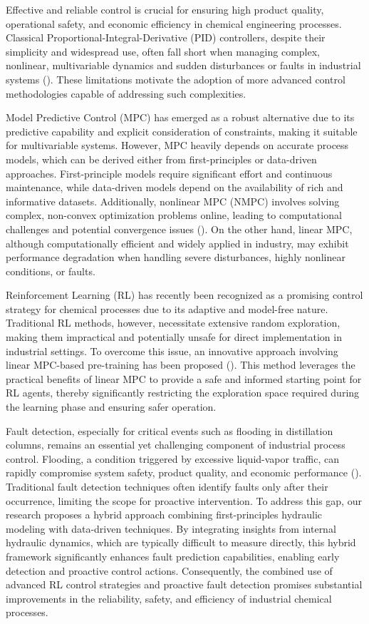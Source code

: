 Effective and reliable control is crucial for ensuring high product quality, operational safety, and economic efficiency in chemical engineering processes. Classical Proportional-Integral-Derivative (PID) controllers, despite their simplicity and widespread use, often fall short when managing complex, nonlinear, multivariable dynamics and sudden disturbances or faults in industrial systems (\cite{wahid2018comparative}). These limitations motivate the adoption of more advanced control methodologies capable of addressing such complexities.


Model Predictive Control (MPC) has emerged as a robust alternative due to its predictive capability and explicit consideration of constraints, making it suitable for multivariable systems. However, MPC heavily depends on accurate process models, which can be derived either from first-principles or data-driven approaches. First-principle models require significant effort and continuous maintenance, while data-driven models depend on the availability of rich and informative datasets. Additionally, nonlinear MPC (NMPC) involves solving complex, non-convex optimization problems online, leading to computational challenges and potential convergence issues (\cite{khather2023review}). On the other hand, linear MPC, although computationally efficient and widely applied in industry, may exhibit performance degradation when handling severe disturbances, highly nonlinear conditions, or faults.

Reinforcement Learning (RL) has recently been recognized as a promising control strategy for chemical processes due to its adaptive and model-free nature. Traditional RL methods, however, necessitate extensive random exploration, making them impractical and potentially unsafe for direct implementation in industrial settings. To overcome this issue, an innovative approach involving linear MPC-based pre-training has been proposed (\cite{hassanpour2024practically}). This method leverages the practical benefits of linear MPC to provide a safe and informed starting point for RL agents, thereby significantly restricting the exploration space required during the learning phase and ensuring safer operation.

Fault detection, especially for critical events such as flooding in distillation columns, remains an essential yet challenging component of industrial process control. Flooding, a condition triggered by excessive liquid-vapor traffic, can rapidly compromise system safety, product quality, and economic performance (\cite{jalanko2021flooding}). Traditional fault detection techniques often identify faults only after their occurrence, limiting the scope for proactive intervention. To address this gap, our research proposes a hybrid approach combining first-principles hydraulic modeling with data-driven techniques. By integrating insights from internal hydraulic dynamics, which are typically difficult to measure directly, this hybrid framework significantly enhances fault prediction capabilities, enabling early detection and proactive control actions. Consequently, the combined use of advanced RL control strategies and proactive fault detection promises substantial improvements in the reliability, safety, and efficiency of industrial chemical processes.

